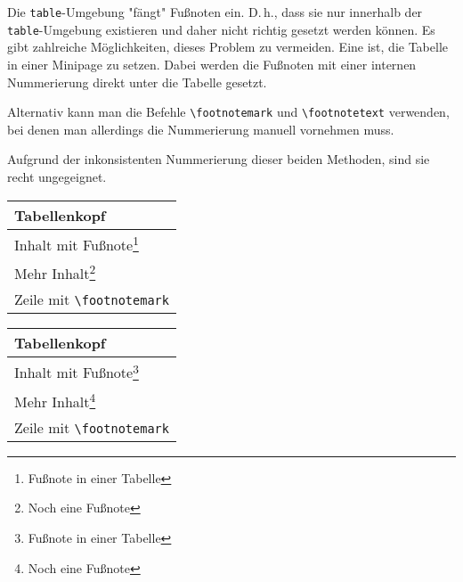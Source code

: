 \begin{minipage}\textwidth
Die \verb+table+-Umgebung "fängt" Fußnoten ein. D.\,h., dass sie nur innerhalb der \verb+table+-Umgebung existieren und daher nicht richtig gesetzt werden können.
Es gibt zahlreiche Möglichkeiten, dieses Problem zu vermeiden. Eine ist, die Tabelle in einer Minipage zu setzen. Dabei werden die Fußnoten mit einer internen Nummerierung direkt unter die Tabelle gesetzt.

Alternativ kann man die Befehle \verb+\footnotemark+ und \verb+\footnotetext+ verwenden, bei denen man allerdings die Nummerierung manuell vornehmen muss.

Aufgrund der inkonsistenten Nummerierung dieser beiden Methoden, sind sie recht ungegeignet.
\begin{lcode}
\begin{minipage}\textwidth
{}
\begin{center}
\begin{tabular}{l}
\toprule
Tabellenkopf	\\
\midrule
Inhalt mit Fußnote\footnote{Fußnote in einer Tabelle}	\\
Mehr Inhalt\footnote{Noch eine Fußnote}	\\
Zeile mit \verb+\footnotemark+\footnotemark	\\
\bottomrule
\end{tabular}
\end{center}
\end{minipage}
\end{lcode}
\begin{minipage}\textwidth
{}
\begin{center}
\begin{tabular}{l}
\toprule
Tabellenkopf  \\
\midrule
Inhalt mit Fußnote\footnote{Fußnote in einer Tabelle} \\
Mehr Inhalt\footnote{Noch eine Fußnote}	\\
Zeile mit \verb+\footnotemark+\footnotemark	\\
\bottomrule
\end{tabular}
\end{center}
\end{minipage}
\end{minipage}

